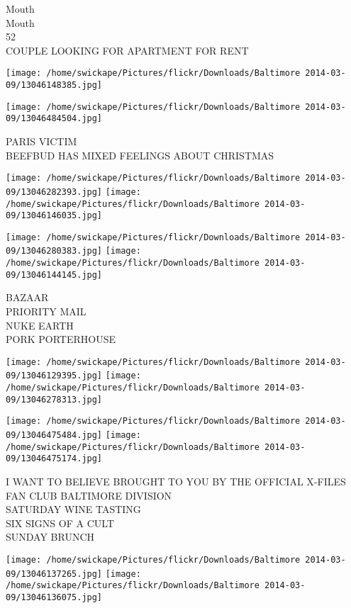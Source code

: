 \documentclass[10pt,letterpaper]{article}
\begin{document}
Mouth\\
Mouth\\
52\\
COUPLE LOOKING FOR APARTMENT FOR RENT
\pagebreak

\texttt{[image: /home/swickape/Pictures/flickr/Downloads/Baltimore 2014-03-09/13046148385.jpg]}

\vspace{0.25in}
\texttt{[image: /home/swickape/Pictures/flickr/Downloads/Baltimore 2014-03-09/13046484504.jpg]}

PARIS VICTIM\\
BEEFBUD HAS MIXED FEELINGS ABOUT CHRISTMAS
\pagebreak

\texttt{[image: /home/swickape/Pictures/flickr/Downloads/Baltimore 2014-03-09/13046282393.jpg]}
\texttt{[image: /home/swickape/Pictures/flickr/Downloads/Baltimore 2014-03-09/13046146035.jpg]}

\texttt{[image: /home/swickape/Pictures/flickr/Downloads/Baltimore 2014-03-09/13046280383.jpg]}
\texttt{[image: /home/swickape/Pictures/flickr/Downloads/Baltimore 2014-03-09/13046144145.jpg]}

BAZAAR\\
PRIORITY MAIL\\
NUKE EARTH\\
PORK PORTERHOUSE
\pagebreak

\texttt{[image: /home/swickape/Pictures/flickr/Downloads/Baltimore 2014-03-09/13046129395.jpg]}
\texttt{[image: /home/swickape/Pictures/flickr/Downloads/Baltimore 2014-03-09/13046278313.jpg]}

\texttt{[image: /home/swickape/Pictures/flickr/Downloads/Baltimore 2014-03-09/13046475484.jpg]}
\texttt{[image: /home/swickape/Pictures/flickr/Downloads/Baltimore 2014-03-09/13046475174.jpg]}

I WANT TO BELIEVE BROUGHT TO YOU BY THE OFFICIAL X{-}FILES FAN CLUB BALTIMORE DIVISION\\
SATURDAY WINE TASTING\\
SIX SIGNS OF A CULT\\
SUNDAY BRUNCH
\pagebreak

\texttt{[image: /home/swickape/Pictures/flickr/Downloads/Baltimore 2014-03-09/13046137265.jpg]}
\texttt{[image: /home/swickape/Pictures/flickr/Downloads/Baltimore 2014-03-09/13046136075.jpg]}
\end{document}
